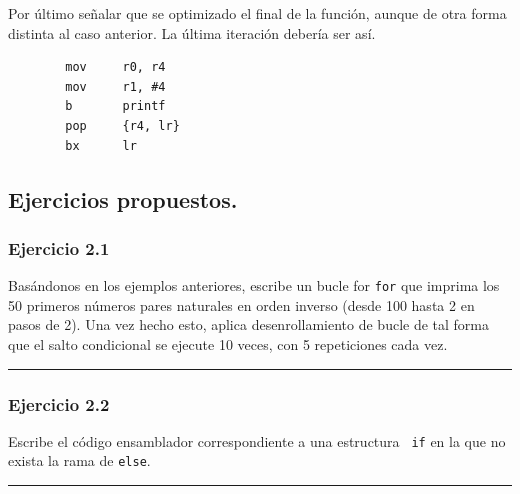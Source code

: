 Por último señalar que se optimizado el final de la función, aunque de otra forma
distinta al caso anterior. La última iteración debería ser así.

\begin{lstlisting}
        mov     r0, r4
        mov     r1, #4
        b       printf
        pop     {r4, lr}
        bx      lr
\end{lstlisting}

\subsection{Ejercicios propuestos.}

\subsubsection{Ejercicio 2.1}
Basándonos en los ejemplos anteriores, escribe un bucle for {\tt for} que imprima
los 50 primeros números pares naturales en orden inverso (desde 100 hasta 2 en pasos
de 2). Una vez hecho esto, aplica desenrollamiento de bucle de tal forma
que el salto condicional se ejecute 10 veces, con 5 repeticiones cada vez.

\begin{center}
\begin{myfbox}
\small
\begin{minipage}{0.92\linewidth}
\begin{center}
\colorbox[gray]{1}{\rule{0cm}{4.5cm}\rule{11cm}{0cm}}
\end{center}
\end{minipage}
\end{myfbox}
\end{center}

\subsubsection{Ejercicio 2.2}
Escribe el código ensamblador correspondiente a una estructura {\tt
if} en la que no exista la rama de {\tt else}.

\begin{center}
\begin{myfbox}
\small
\begin{minipage}{0.92\linewidth}
\begin{center}
\colorbox[gray]{1}{\rule{0cm}{4.5cm}\rule{11cm}{0cm}}
\end{center}
\end{minipage}
\end{myfbox}
\end{center}

